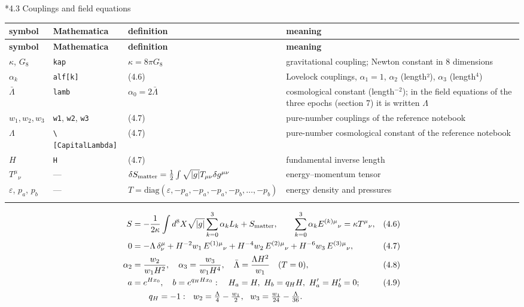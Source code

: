 \documentclass[10pt,a4paper]{article}
\makeatletter
\renewcommand\subsection{\@startsection{subsection}{2}{\z@}{-3.25ex\@plus -1ex \@minus -.2ex}{1.5ex \@plus .2ex}{\normalfont\large\bfseries\raggedright}}
\makeatother
\begin{document}
\subsection*{4.3 Couplings and field equations}
{\small
\begin{longtable}{>{\raggedright\arraybackslash}p{}>{\raggedright\arraybackslash}p{}>{\raggedright\arraybackslash}p{}>{\raggedright\arraybackslash}p{}}
\toprule
\textbf{symbol} & \textbf{Mathematica} & \textbf{definition} & \textbf{meaning} \\
\midrule\endfirsthead
\toprule
\textbf{symbol} & \textbf{Mathematica} & \textbf{definition} & \textbf{meaning} \\
\midrule\endhead
\endfoot
\bottomrule\endlastfoot
$\kappa$, $G_8$ & \texttt{kap} & $\kappa=8\pi G_8$ & gravitational coupling; Newton constant in 8 dimensions \\
$\alpha_k$ & \texttt{alf[k]} & (4.6) & Lovelock couplings, $\alpha_1=1$, $\alpha_2$ (length²), $\alpha_3$ (length\texorpdfstring{\ensuremath{{}^{4}}}{⁴}) \\
$\bar\Lambda$ & \texttt{lamb} & $\alpha_0=2\bar\Lambda$ & cosmological constant (length$^{-2}$); in the field equations of the three epochs (section 7) it is written $\Lambda$ \\
$w_1,w_2,w_3$ & \texttt{w1}, \texttt{w2}, \texttt{w3} & (4.7) & pure-number couplings of the reference notebook \\
$\Lambda$ & \texttt{\textbackslash{}\allowbreak{}[CapitalLambda]} & (4.7) & pure-number cosmological constant of the reference notebook \\
$H$ & \texttt{H} & (4.7) & fundamental inverse length \\
$T^\mu{}_\nu$ & — & $\delta S_{\rm matter}=\tfrac12\int\sqrt{|g|}T_{\mu\nu}\delta g^{\mu\nu}$ & energy–momentum tensor \\
$\varepsilon$, $p_a$, $p_b$ & — & $T=\mathrm{diag}(\varepsilon,-p_a,-p_a,-p_a,-p_b,\dots,-p_b)$ & energy density and pressures \\*
\end{longtable}}
\begin{align*}
S&=-\frac{1}{2\kappa}\int d^8X\sqrt{|g|}\sum_{k=0}^3\alpha_kL_k+S_{\rm matter},\qquad \sum_{k=0}^{3}\alpha_kE^{(k)\mu}{}_\nu=\kappa T^\mu{}_\nu,&&(4.6) \\
0&=-\Lambda\,\delta^\mu_\nu+H^{-2}w_1\,E^{(1)\mu}{}_\nu+H^{-4}w_2\,E^{(2)\mu}{}_\nu+H^{-6}w_3\,E^{(3)\mu}{}_\nu,&&(4.7) \\
\alpha_2&=\frac{w_2}{w_1H^2},\quad \alpha_3=\frac{w_3}{w_1H^4},\quad \bar\Lambda=\frac{\Lambda H^2}{w_1}\quad(T=0),&&(4.8) \\
a&=e^{Hx_0},\quad b=e^{q_HHx_0}:\quad H_a=H,\ H_b=q_HH,\ H_a'=H_b'=0;&&(4.9) \\
&\qquad q_H=-1:\ \ w_2=\tfrac{\Lambda}{4}-\tfrac{w_1}{2},\ \ w_3=\tfrac{w_1}{24}-\tfrac{\Lambda}{36}.
\end{align*}
\end{document}
